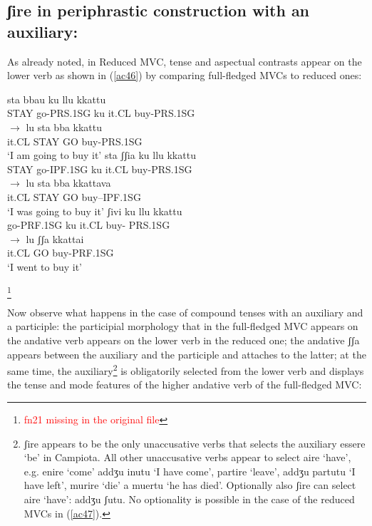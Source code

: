 \documentclass[output=paper]{langscibook}
\begin{document}
\subsection{ʃire in periphrastic construction with an auxiliary:}

As already noted, in Reduced MVC, tense and aspectual contrasts appear on the lower verb as shown in (\ref{ac46}) by comparing full-fledged MVCs to reduced ones:

\ea\label{ac46}
    \ea\label{ac46a}
        \ea \label{ac46ai}\gll sta    bbau     ku   llu   kkattu\\
        STAY go-PRS.1SG  ku   it.CL buy-PRS.1SG   \\
        \ex \label{ac46aii}$\rightarrow$ \gll lu    sta    bba  kkattu\\
        it.CL  STAY GO  buy-PRS.1SG \\
        \glt ‘I am going to buy it’
        \z
    \ex\label{ac46b}
        \ea  \label{ac46bi}\gll sta    ʃʃia       ku   llu    kkattu \\
       STAY go-IPF.1SG  ku   it.CL  buy-PRS.1SG  \\
        \ex  \label{ac46bii}$\rightarrow$ \gll lu    sta    bba   kkattava\\
       it.CL   STAY GO   buy--IPF.1SG\\
       \glt ‘I was going to buy it’
        \z
    \ex\label{ac46c}
        \ea  \label{ac46ci}\gll ʃivi       ku   llu   kkattu \\
       go-PRF.1SG  ku   it.CL  buy- PRS.1SG \\
        \ex  \label{ac46cii}$\rightarrow$ \gll lu     ʃʃa   kkattai\\
       it.CL   GO  buy-PRF.1SG\\
       \glt ‘I went to buy it’
        \z
    \z
\z

\footnote{\textcolor{red}{fn21 missing in the original file}}

Now observe what happens in the case of compound tenses with an auxiliary and a participle: the participial morphology that in the full-fledged MVC appears on the andative verb appears on the lower verb in the reduced one; the andative ʃʃa  appears between the auxiliary and the participle and attaches to the latter; at the same time, the auxiliary\footnote{ʃire appears to be the only unaccusative verbs that selects the auxiliary essere ‘be’ in Campiota.  All other unaccusative verbs appear to select aire ‘have’, e.g. enire ‘come’ addʒu inutu ‘I have come’, partire ‘leave’, addʒu partutu ‘I have left’, murire ‘die’ a muertu ‘he has died’. Optionally also ʃire can select aire ‘have’: addʒu ʃutu.  No optionality is possible in the case of the reduced MVCs in (\ref{ac47}).}  is obligatorily selected from the lower verb and displays the tense and mode features of the higher andative verb of the full-fledged MVC:
\end{document}
